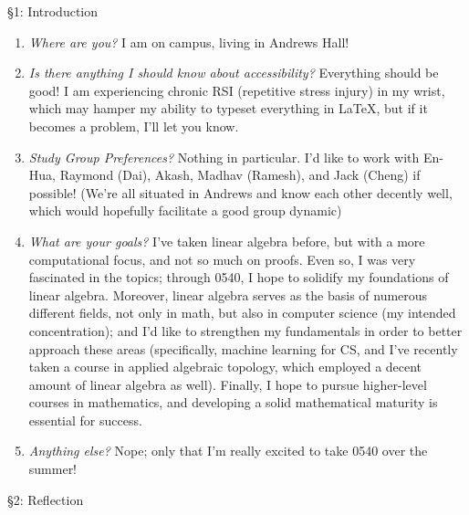 \documentclass{homework}
\begin{document}
\begin{problem}{\S 1: Introduction}
\end{problem}

\begin{enumerate}[label=(\alph*)]
  \item \textit{Where are you?} I am on campus, living in Andrews Hall!
  \item \textit{Is there anything I should know about accessibility?} Everything should be good! I
    am experiencing chronic RSI (repetitive stress injury) in my wrist, which may hamper my ability
    to typeset everything in LaTeX, but if it becomes a problem, I'll let you know.
  \item \textit{Study Group Preferences?} Nothing in particular. I'd like to work with En-Hua,
    Raymond (Dai), Akash, Madhav (Ramesh), and Jack (Cheng) if possible! (We're all situated in
    Andrews and know each other decently well, which would hopefully facilitate a good group
    dynamic)
  \item \textit{What are your goals?} I've taken linear algebra before, but with a more
    computational focus, and not so much on proofs. Even so, I was very fascinated in the topics;
    through 0540, I hope to solidify my foundations of linear algebra. Moreover, linear algebra
    serves as the basis of numerous different fields, not only in math, but also in computer science
    (my intended concentration); and I'd like to strengthen my fundamentals in order to better
    approach these areas (specifically, machine learning for CS, and I've recently taken a course in
    applied algebraic topology, which employed a decent amount of linear algebra as well). Finally,
    I hope to pursue higher-level courses in mathematics, and developing a solid mathematical
    maturity is essential for success.
  \item \textit{Anything else?} Nope; only that I'm really excited to take 0540 over the summer!
\end{enumerate}

\begin{problem}{\S 2: Reflection}
  
\end{problem}
\end{document}
